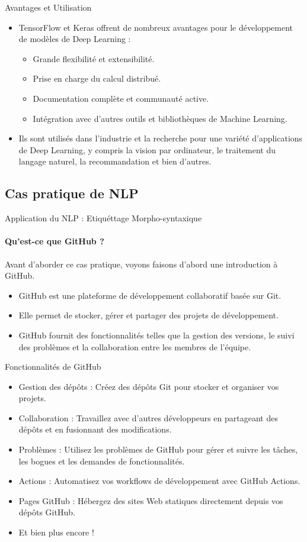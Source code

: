 \documentclass{beamer}
\begin{document}
\begin{frame}{Avantages et Utilisation}
	\begin{itemize}
		\item TensorFlow et Keras offrent de nombreux avantages pour le développement de modèles de Deep Learning :
		\begin{itemize}
			\item Grande flexibilité et extensibilité.
			\item Prise en charge du calcul distribué.
			\item Documentation complète et communauté active.
			\item Intégration avec d'autres outils et bibliothèques de Machine Learning.
		\end{itemize}
		\item Ils sont utilisés dans l'industrie et la recherche pour une variété d'applications de Deep Learning, y compris la vision par ordinateur, le traitement du langage naturel, la recommandation et bien d'autres.
	\end{itemize}
\end{frame}

\subsection{Cas pratique de NLP}
\begin{frame}{Application du NLP : Etiquéttage Morpho-syntaxique}
	\framesubtitle{Qu'est-ce que GitHub ?}
	Avant d'aborder ce cas pratique, voyons faisons d'abord une introduction à GitHub.
	\begin{itemize}
		\item GitHub est une plateforme de développement collaboratif basée sur Git.
		\item Elle permet de stocker, gérer et partager des projets de développement.
		\item GitHub fournit des fonctionnalités telles que la gestion des versions, le suivi des problèmes et la collaboration entre les membres de l'équipe.
	\end{itemize}
\end{frame}

\begin{frame}{Fonctionnalités de GitHub}
	\begin{itemize}
		\item Gestion des dépôts : Créez des dépôts Git pour stocker et organiser vos projets.
		\item Collaboration : Travaillez avec d'autres développeurs en partageant des dépôts et en fusionnant des modifications.
		\item Problèmes : Utilisez les problèmes de GitHub pour gérer et suivre les tâches, les bogues et les demandes de fonctionnalités.
		\item Actions : Automatisez vos workflows de développement avec GitHub Actions.
		\item Pages GitHub : Hébergez des sites Web statiques directement depuis vos dépôts GitHub.
		\item Et bien plus encore !
	\end{itemize}
\end{frame}
\end{document}
